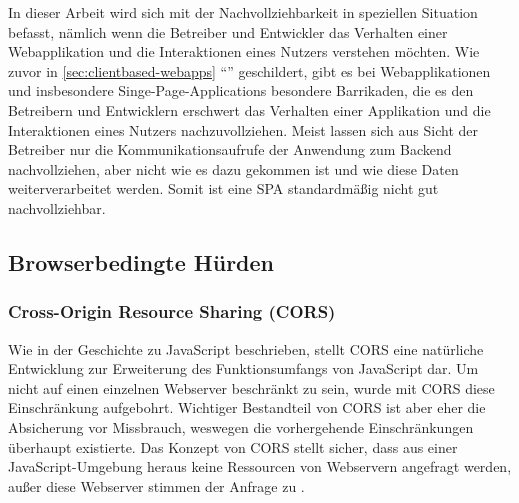 In dieser Arbeit wird sich mit der Nachvollziehbarkeit in speziellen Situation befasst, nämlich wenn die Betreiber und Entwickler das Verhalten einer Webapplikation und die Interaktionen eines Nutzers verstehen möchten. Wie zuvor in \autoref{sec:clientbased-webapps} \enquote{} geschildert, gibt es bei Webapplikationen und insbesondere Singe-Page-Applications besondere Barrikaden, die es den Betreibern und Entwicklern erschwert das Verhalten einer Applikation und die Interaktionen eines Nutzers nachzuvollziehen. Meist lassen sich aus Sicht der Betreiber nur die Kommunikationsaufrufe der Anwendung zum Backend nachvollziehen, aber nicht wie es dazu gekommen ist und wie diese Daten weiterverarbeitet werden. Somit ist eine SPA standardmäßig nicht gut nachvollziehbar.
	


\subsection{Browserbedingte Hürden}


\subsubsection{Cross-Origin Resource Sharing (CORS)}

Wie in der Geschichte zu JavaScript beschrieben, stellt CORS eine natürliche Entwicklung zur Erweiterung des Funktionsumfangs von JavaScript dar. Um nicht auf einen einzelnen Webserver beschränkt zu sein, wurde mit CORS diese Einschränkung aufgebohrt. Wichtiger Bestandteil von CORS ist aber eher die Absicherung vor Missbrauch, weswegen die vorhergehende Einschränkungen überhaupt existierte. Das Konzept von CORS stellt sicher, dass aus einer JavaScript-Umgebung heraus keine Ressourcen von Webservern angefragt werden, außer diese Webserver stimmen der Anfrage zu \cite{MDNCORS}.

